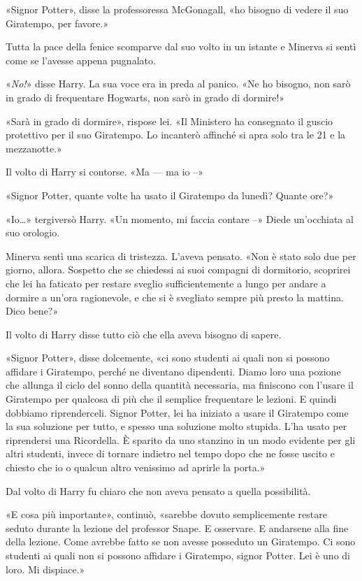 «Signor Potter», disse la professoressa McGonagall, «ho bisogno di vedere il suo Giratempo, per favore.»

Tutta la pace della fenice scomparve dal suo volto in un istante e Minerva si sentì come se l’avesse appena pugnalato.

«\textit{No!}» disse Harry. La sua voce era in preda al panico. «Ne ho bisogno, non sarò in grado di frequentare Hogwarts, non sarò in grado di dormire!»

«Sarà in grado di dormire», rispose lei. «Il Ministero ha consegnato il guscio protettivo per il suo Giratempo. Lo incanterò affinché si apra solo tra le 21 e la mezzanotte.»

Il volto di Harry si contorse. «Ma — ma io –»

«Signor Potter, quante volte ha usato il Giratempo da lunedì? Quante ore?»

«Io…» tergiversò Harry. «Un momento, mi faccia contare –» Diede un’occhiata al suo orologio.

Minerva sentì una scarica di tristezza. L’aveva pensato. «Non è stato solo due per giorno, allora. Sospetto che se chiedessi ai suoi compagni di dormitorio, scoprirei che lei ha faticato per restare sveglio sufficientemente a lungo per andare a dormire a un’ora ragionevole, e che si è svegliato sempre più presto la mattina. Dico bene?»

Il volto di Harry disse tutto ciò che ella aveva bisogno di sapere.

«Signor Potter», disse dolcemente, «ci sono studenti ai quali non si possono affidare i Giratempo, perché ne diventano dipendenti. Diamo loro una pozione che allunga il ciclo del sonno della quantità necessaria, ma finiscono con l’usare il Giratempo per qualcosa di più che il semplice frequentare le lezioni. E quindi dobbiamo riprenderceli. Signor Potter, lei ha iniziato a usare il Giratempo come la sua soluzione per tutto, e spesso una soluzione molto stupida. L’ha usato per riprendersi una Ricordella. È sparito da uno stanzino in un modo evidente per gli altri studenti, invece di tornare indietro nel tempo dopo che ne fosse uscito e chiesto che io o qualcun altro venissimo ad aprirle la porta.»

Dal volto di Harry fu chiaro che non aveva pensato a quella possibilità.

«E cosa più importante», continuò, «sarebbe dovuto semplicemente restare seduto durante la lezione del professor Snape. E osservare. E andarsene alla fine della lezione. Come avrebbe fatto se non avesse posseduto un Giratempo. Ci sono studenti ai quali non si possono affidare i Giratempo, signor Potter. Lei è uno di loro. Mi dispiace.»


